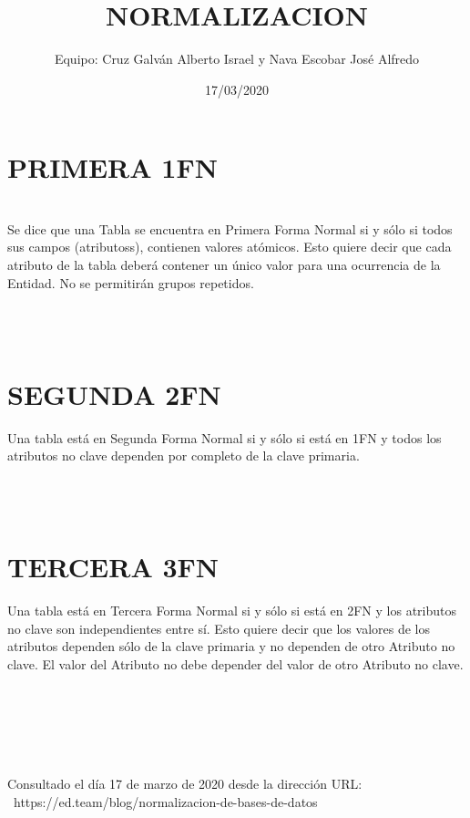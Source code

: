 \documentclass{article}
\title{NORMALIZACION}
\author{Equipo: Cruz Galván Alberto Israel y Nava Escobar José Alfredo}
\date{17/03/2020}
\begin{document}
\maketitle

\section{PRIMERA 1FN}
\\ 
Se dice que una Tabla se encuentra en Primera Forma Normal si y sólo si todos sus campos (atributoss), contienen valores atómicos. Esto quiere decir que cada atributo de la tabla deberá contener un único valor para una ocurrencia de la Entidad. No se permitirán grupos repetidos.
 
\\\\
\section{SEGUNDA 2FN}
Una tabla está en Segunda Forma Normal si y sólo si está en 1FN y todos los atributos no clave dependen por completo de la clave primaria. 

\\\\
\section{TERCERA 3FN}
Una tabla está en Tercera Forma Normal si y sólo si está en 2FN y los atributos no clave son independientes entre sí. Esto quiere decir que los valores de los atributos dependen sólo de la clave primaria y no dependen de otro Atributo no clave. El valor del Atributo no debe depender del valor de otro Atributo no clave.

\\\ \\\\ \\\\ 
Consultado el día 17 de marzo de 2020 desde la dirección URL:\\\  https://ed.team/blog/normalizacion-de-bases-de-datos
\end{document}
